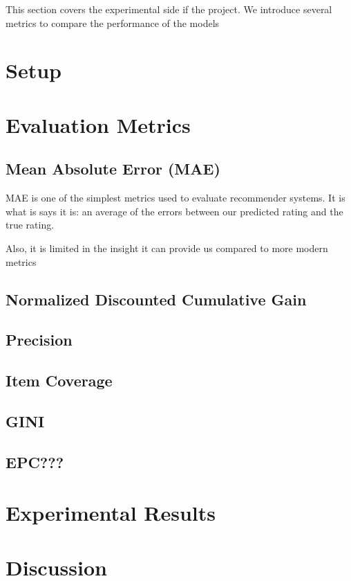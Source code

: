This section covers the experimental side if the project. We introduce several metrics to compare the performance of the models
\section{Setup}

\section{Evaluation Metrics}

\subsection{Mean Absolute Error (MAE)}
MAE is one of the simplest metrics used to evaluate recommender systems. It is what is says it is: an average of the errors between our predicted rating and the true rating. 


Also, it is limited in the insight it can provide us compared to more modern metrics

\subsection{Normalized Discounted Cumulative Gain}

\subsection{Precision}

\subsection{Item Coverage}

\subsection{GINI}

\subsection{EPC???}

\section{Experimental Results}

\section{Discussion}